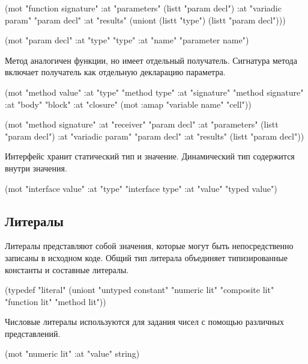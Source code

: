 \documentclass[12pt,twoside,russian]{article}
\begin{document}
\begin{ABMLCode}
(mot "function signature" 
     :at "parameters"     (listt "param decl") 
     :at "variadic param" "param decl" 
     :at "results"        (uniont (listt "type") (listt "param decl")))

(mot "param decl" :at "type" "type" :at "name" "parameter name")
\end{ABMLCode}

Метод аналогичен функции, но имеет отдельный получатель. Сигнатура метода включает получатель как отдельную декларацию параметра.

\begin{ABMLCode}
(mot "method value" 
	:at "type"      "method type"
	:at "signature" "method signature" 
	:at "body"      "block" 
	:at "closure"   (mot :amap "variable name" "cell"))

(mot "method signature" 
	:at "receiver"       "param decl" 
	:at "parameters"     (listt "param decl") 
	:at "variadic param" "param decl" 
	:at "results"        (listt "param decl"))
\end{ABMLCode}

Интерфейс хранит статический тип и значение. Динамический тип содержится внутри 
значения.

\begin{ABMLCode}
(mot "interface value" 
	:at "type"  "interface type" 
	:at "value" "typed value")
\end{ABMLCode}


\subsection{Литералы}
Литералы представляют собой значения, которые могут быть непосредственно записаны в исходном коде. Общий тип литерала объединяет типизированные константы и составные литералы.

\begin{ABMLCode}
(typedef "literal" 
    (uniont "untyped constant" "numeric lit" 
            "composite lit" "function lit" "method lit"))
\end{ABMLCode}

Числовые литералы используются для задания чисел с помощью различных представлений.

\begin{ABMLCode}
(mot "numeric lit" :at "value" string)
\end{ABMLCode}
\end{document}
